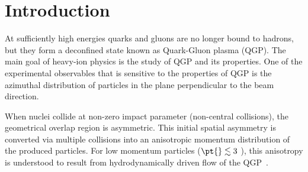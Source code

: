 \begin{abstract}
\end{abstract}
\newpage
\tableofcontents
\newpage
\listoffigures

\clearpage
\section{Introduction}
 At sufficiently high energies quarks and gluons are no longer bound to hadrons, but they form a deconfined state known as Quark-Gluon plasma (QGP). The main goal of heavy-ion physics is the study of QGP and its properties.
One of the experimental observables that is sensitive to the properties of QGP is the azimuthal distribution of particles in the plane perpendicular to the beam direction. 

When nuclei collide at non-zero impact parameter (non-central collisions), the geometrical overlap region is asymmetric. This initial spatial asymmetry is converted via multiple collisions into an anisotropic momentum distribution of the produced particles. For low momentum particles ($\pt{} \lesssim 3$ \gevc), this anisotropy is understood to result from hydrodynamically driven flow of the QGP~\cite{Adcox:2004mh, Adams:2005dq, Ollitrault:1992, Heinz:2002, Shuryak:2009}. 

